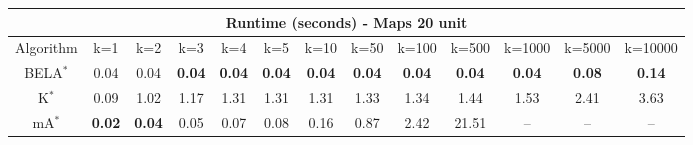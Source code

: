 \begin{tabular}{c|cccccccccccc}\toprule
\multicolumn{13}{c}{Runtime (seconds) - Maps 20 unit}\\ \midrule
Algorithm & k=1 & k=2 & k=3 & k=4 & k=5 & k=10 & k=50 & k=100 & k=500 & k=1000 & k=5000 & k=10000 \\ \midrule
BELA$^*$ & 0.04 & 0.04 & \textbf{0.04} & \textbf{0.04} & \textbf{0.04} & \textbf{0.04} & \textbf{0.04} & \textbf{0.04} & \textbf{0.04} & \textbf{0.04} & \textbf{0.08} & \textbf{0.14} \\
K$^*$ & 0.09 & 1.02 & 1.17 & 1.31 & 1.31 & 1.31 & 1.33 & 1.34 & 1.44 & 1.53 & 2.41 & 3.63 \\
mA$^*$ & \textbf{0.02} & \textbf{0.04} & 0.05 & 0.07 & 0.08 & 0.16 & 0.87 & 2.42 & 21.51 & -- & -- & -- \\ \bottomrule 
\end{tabular}
